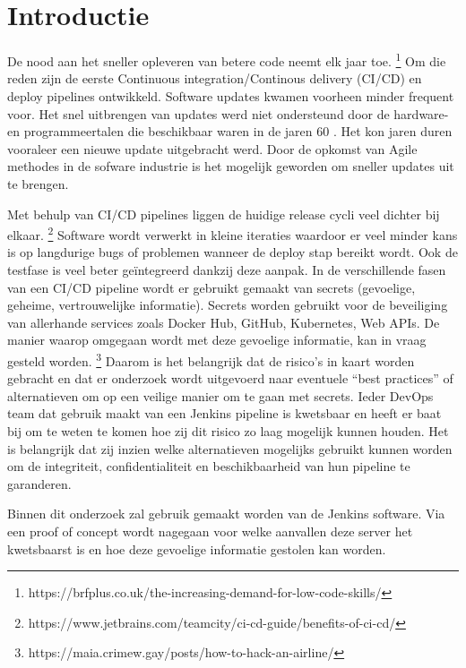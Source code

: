 
\section{Introductie}%
\label{sec:introductie}

De nood aan het sneller opleveren van betere code neemt elk jaar toe. \footnote{https://brfplus.co.uk/the-increasing-demand-for-low-code-skills/} Om die reden zijn de eerste Continuous integration/Continous delivery (CI/CD) en deploy pipelines ontwikkeld. Software updates kwamen voorheen minder frequent voor. Het snel uitbrengen van updates werd niet ondersteund door de hardware- en programmeertalen die beschikbaar waren in de jaren 60 \autocite{Jiang2009}. Het kon jaren duren vooraleer een nieuwe update uitgebracht werd. Door de opkomst van Agile methodes in de sofware industrie is het mogelijk geworden om sneller updates uit te brengen. 

Met behulp van CI/CD pipelines liggen de huidige release cycli veel dichter bij elkaar. \footnote{https://www.jetbrains.com/teamcity/ci-cd-guide/benefits-of-ci-cd/} Software wordt verwerkt in kleine iteraties waardoor er veel minder kans is op langdurige bugs of problemen wanneer de deploy stap bereikt wordt. Ook de testfase is veel beter geïntegreerd dankzij deze aanpak. In de verschillende fasen van een CI/CD pipeline wordt er gebruikt gemaakt van secrets (gevoelige, geheime, vertrouwelijke informatie). Secrets worden gebruikt voor de beveiliging van allerhande services zoals Docker Hub, GitHub, Kubernetes, Web APIs. De manier waarop omgegaan wordt met deze gevoelige informatie, kan in vraag gesteld worden. \footnote{https://maia.crimew.gay/posts/how-to-hack-an-airline/} Daarom is het belangrijk dat de risico’s in kaart worden gebracht en dat er onderzoek wordt uitgevoerd naar eventuele “best practices” of alternatieven om op een veilige manier om te gaan met secrets. Ieder \mbox{DevOps} team dat gebruik maakt van een Jenkins pipeline is kwetsbaar en heeft er baat bij om te weten te komen hoe zij dit risico zo laag mogelijk kunnen houden. Het is belangrijk dat zij inzien welke alternatieven mogelijks gebruikt kunnen worden om de integriteit, confidentialiteit en beschikbaarheid van hun pipeline te garanderen.  

Binnen dit onderzoek zal gebruik gemaakt worden van de Jenkins software. Via een proof of concept wordt nagegaan voor welke aanvallen deze server het kwetsbaarst is en hoe deze gevoelige informatie gestolen kan worden.

